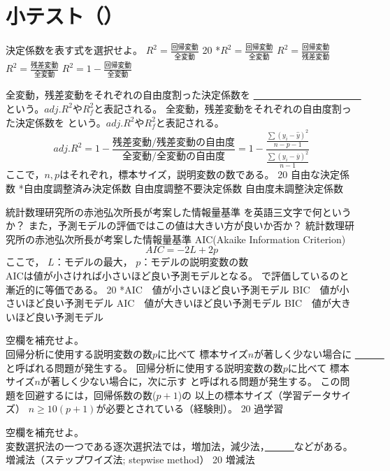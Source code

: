 \newcommand{\Release}{}
\newcommand{\Slide}{}
\newcommand{\PrintLecture}{1}
\newcommand{\PrintSolution}{1}







\maketitle

\section{小テスト（\MyClass）}

\begin{quiz}{\MyClass}

\QuizMultipleChoices
{
  決定係数を表す式を選択せよ。
}
{
  $R^2=\frac{回帰変動}{全変動}$
}
{20}
{*$R^2=\frac{回帰変動}{全変動}$}
{ $R^2=\frac{回帰変動}{残差変動}$}
{ $R^2=\frac{残差変動}{全変動}$}
{ $R^2=1-\frac{回帰変動}{全変動}$}

\QuizMultipleChoices
{
  全変動，残差変動をそれぞれの自由度割った決定係数を
  \underline{　　　　　　　　　　　}という。$adj.R^2$や$R_f^2$と表記される。
}
{
  全変動，残差変動をそれぞれの自由度割った決定係数を
  という。$adj.R^2$や$R_f^2$と表記される。
  \[adj.R^2
    =1-\frac{残差変動/残差変動の自由度}{全変動/全変動の自由度}
    =1-\frac{\frac{\sum(y_i-\hat{y})^2}{n-p-1}}
            {\frac{\sum(y_i-\bar{y})^2}{n-1}}\]
  ここで，$n,p$はそれぞれ，標本サイズ，説明変数の数である。
}
{20}
{ 自由な決定係数}
{*自由度調整済み決定係数}
{ 自由度調整不要決定係数}
{ 自由度未調整決定係数}

\QuizMultipleChoices
{
  統計数理研究所の赤池弘次所長が考案した情報量基準
  を英語三文字で何というか？
  また，予測モデルの評価ではこの値は大きい方が良いか否か？
}
{
  統計数理研究所の赤池弘次所長が考案した情報量基準
  AIC(Akaike Information Criterion)\\
  \[AIC=-2L+2p\]
  ここで，
  $L$：モデルの最大，
  $p$：モデルの説明変数の数\\
  AICは値が小さければ小さいほど良い予測モデルとなる。
  で評価しているのと漸近的に等価である。
}
{20}
{*AIC　値が小さいほど良い予測モデル}
{ BIC　値が小さいほど良い予測モデル}
{ AIC　値が大きいほど良い予測モデル}
{ BIC　値が大きいほど良い予測モデル}

\QuizShortAnswer
{
  空欄を補充せよ。\\
  回帰分析に使用する説明変数の数$p$に比べて
  標本サイズ$n$が著しく少ない場合に
  \underline{　　　}と呼ばれる問題が発生する。
}
{
  回帰分析に使用する説明変数の数$p$に比べて
  標本サイズ$n$が著しく少ない場合に，次に示す
  と呼ばれる問題が発生する。
  この問題を回避するには，回帰係数の数($p+1$)の
  以上の標本サイズ（学習データサイズ）
  $n\ge10(p+1)$が必要とされている（経験則）。
}
{20}
{過学習}
{}
{}
{}

\QuizShortAnswer
{
  空欄を補充せよ。\\
  変数選択法の一つである逐次選択法では，増加法，減少法，\underline{　　　}などがある。
}
{
  増減法（ステップワイズ法; stepwise method）
}
{20}
{増減法}
{}
{}
{}


\end{quiz}


